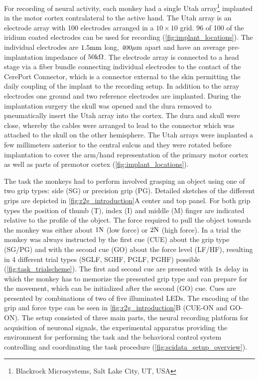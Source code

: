 For recording of neural activity, each monkey had a single Utah array\footnote{Blackrock Microsystems, Salt Lake City, UT, USA} implanted in the motor cortex contralateral to the active hand. The Utah array is an electrode array with 100 electrodes arranged in a $10\times10$ grid. 96 of 100 of the iridium coated electrodes can be used for recording (\cref{fig:implant_locations}). The individual electrodes are $1.5\textnormal{mm}$ long, $400\mu\textnormal{m}$ apart and have an average pre-implantation impedance of $50\textnormal{k}\Omega$. The electrode array is connected to a head stage via a fiber bundle connecting individual electrodes to the contact of the CerePort Connector, which is a connector external to the skin permitting the daily coupling of the implant to the recording setup. In addition to the array electrodes one ground and two reference electrodes are implanted. During the implantation surgery the skull was opened and the dura removed to pneumatically insert the Utah array into the cortex. The dura and skull were close, whereby the cables were arranged to lead to the connector which was attached to the skull on the other hemisphere. The Utah arrays were implanted a few millimeters anterior to the central sulcus and they were rotated before implantation to cover the arm/hand representation of the primary motor cortex as well as parts of premotor cortex (\cref{fig:implant_locations}).

The task the monkeys had to perform involved grasping an object using one of two grip types: side (SG) or precision grip (PG). Detailed sketches of the different grips are depicted in   \cref{fig:r2g_introduction}A center and top panel. For both grip types the position of thumb (T), index (I) and middle (M) finger are indicated relative to the profile of the object. The force required to pull the object towards the monkey was either about $1\textnormal{N}$ (low force) or $2\textnormal{N}$ (high force).  In a trial the monkey was always instructed by the first cue (CUE) about the grip type (SG/PG) and with the second cue (GO) about the force level (LF/HF), resulting in 4 different trial types (SGLF, SGHF, PGLF, PGHF) possible (\cref{fig:task_trialscheme}). The first and second cue are presented with $1\textnormal{s}$ delay in which the monkey has to memorize the presented grip type and can prepare for the movement, which can be initialized after the second (GO) cue. Cues are presented by combinations of two of five illuminated LEDs. The encoding of the grip and force type can be seen in \cref{fig:r2g_introduction}B (CUE-ON and GO-ON). The setup consisted of three main parts, the neural recording platform for acquisition of neuronal signals, the experimental apparatus providing the environment for performing the task and the behavioral control system controlling and coordinating the task procedure (\cref{fig:scidata_setup_overview}).

